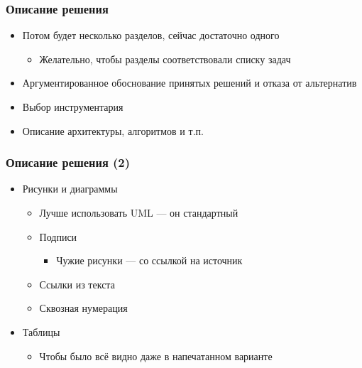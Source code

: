 \documentclass[xetex,mathserif,serif]{beamer}
\begin{document}
    \begin{frame}
        \frametitle{Описание решения}
        \begin{itemize}
            \item Потом будет несколько разделов, сейчас достаточно одного
            \begin{itemize}
                \item Желательно, чтобы разделы соответствовали списку задач
            \end{itemize}
            \item Аргументированное обоснование принятых решений и отказа от альтернатив
            \item Выбор инструментария
            \item Описание архитектуры, алгоритмов и т.п.
        \end{itemize}
    \end{frame}

    \begin{frame}
        \frametitle{Описание решения (2)}
        \begin{itemize}
            \item Рисунки и диаграммы
            \begin{itemize}
                \item Лучше использовать UML --- он стандартный
                \item Подписи
                \begin{itemize}
                    \item Чужие рисунки --- со ссылкой на источник
                \end{itemize}
                \item Ссылки из текста
                \item Сквозная нумерация
            \end{itemize}
            \item Таблицы
            \begin{itemize}
                \item Чтобы было всё видно даже в напечатанном варианте
            \end{itemize}
        \end{itemize}
    \end{frame}
\end{document}
